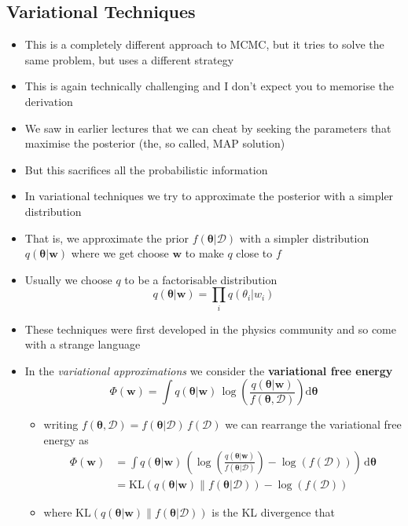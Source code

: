 \documentclass[11pt]{article}
\newcommand{\logg}[1]{\log\!\left( #1 \right)}
\newcommand{\dd}{\mathrm{d}}
\begin{document}
\subsection{Variational Techniques}
\label{sec:org0d16109}
\begin{itemize}
\item This is a completely different approach to MCMC, but it tries to
solve the same problem, but uses a different strategy
\item This is again technically challenging and I don't expect you to
memorise the derivation
\item We saw in earlier lectures that we can cheat by seeking the parameters that maximise
the posterior (the, so called, MAP solution)
\item But this sacrifices all the probabilistic information
\item In variational techniques we try to approximate the posterior
with a simpler distribution
\item That is, we approximate the prior \(f(\bm{\theta}|\mathcal{D})\)
with a simpler distribution \(q(\bm{\theta}|\bm{w})\) where we get
choose \(\bm{w}\) to make \(q\) close to \(f\)
\item Usually we choose \(q\) to be a factorisable distribution
$$ q(\bm{\theta}|\bm{w}) = \prod_{i} q(\theta_{i}|w_{i}) $$
\item These techniques were first developed in the physics community
and so come with a strange language
\item In the \emph{variational approximations} we consider the \textbf{variational free
energy}
$$ \Phi(\bm{w}) = \int q(\bm{\theta}|\bm{w}) \,
     \logg{\frac{q(\bm{\theta}|\bm{w})}{f(\bm{\theta},\mathcal{D})}}
     \dd \bm{\theta} $$
\begin{itemize}
\item writing \(f(\bm{\theta},\mathcal{D}) =
       f(\bm{\theta}|\mathcal{D})\, f(\mathcal{D})\) we can rearrange the
variational free energy as
\begin{align*}
 \Phi(\bm{w}) &= \int q(\bm{\theta}|\bm{w}) \, \left(
 \logg{\frac{q(\bm{\theta}|\bm{w})}{f(\bm{\theta}|\mathcal{D})}} -
 \logg{f(\mathcal{D})} \right) \, \dd \bm{\theta} \\
 &= \mathrm{KL}\!\left(q(\bm{\theta}|\bm{w}) \big\|
 f(\bm{\theta}|\mathcal{D})\right)  - \logg{f(\mathcal{D})} 
 \end{align*}
\item where \(\mathrm{KL}\!\left(q(\bm{\theta}|\bm{w}) \big\|
        f(\bm{\theta}|\mathcal{D})\right)\) is the KL divergence that

\end{itemize}
\end{itemize}
\end{document}
